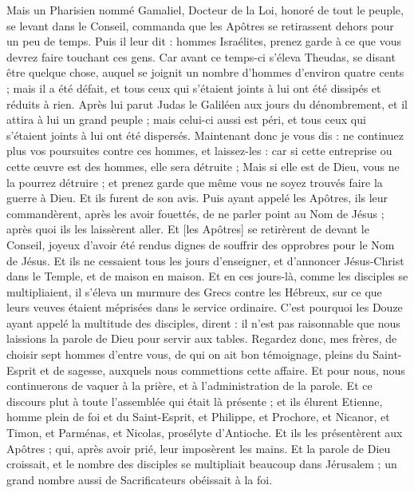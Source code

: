 \begin{multicols}{2}
Mais un Pharisien nommé Gamaliel, Docteur de la Loi, honoré de tout le peuple, se levant dans le Conseil, commanda que les Apôtres se retirassent dehors pour un peu de temps.
Puis il leur dit : hommes Israélites, prenez garde à ce que vous devrez faire touchant ces gens.
Car avant ce temps-ci s'éleva Theudas, se disant être quelque chose, auquel se joignit un nombre d'hommes d'environ quatre cents ; mais il a été défait, et tous ceux qui s'étaient joints à lui ont été dissipés et réduits à rien.
Après lui parut Judas le Galiléen aux jours du dénombrement, et il attira à lui un grand peuple ; mais celui-ci aussi est péri, et tous ceux qui s'étaient joints à lui ont été dispersés.
Maintenant donc je vous dis : ne continuez plus vos poursuites contre ces hommes, et laissez-les : car si cette entreprise ou cette œuvre est des hommes, elle sera détruite ;
Mais si elle est de Dieu, vous ne la pourrez détruire ; et prenez garde que même vous ne soyez trouvés faire la guerre à Dieu. Et ils furent de son avis.
Puis ayant appelé les Apôtres, ils leur commandèrent, après les avoir fouettés, de ne parler point au Nom de Jésus ; après quoi ils les laissèrent aller.
Et [les Apôtres] se retirèrent de devant le Conseil, joyeux d'avoir été rendus dignes de souffrir des opprobres pour le Nom de Jésus.
Et ils ne cessaient tous les jours d'enseigner, et d'annoncer Jésus-Christ dans le Temple, et de maison en maison.
\VerseOne{}Et en ces jours-là, comme les disciples se multipliaient, il s'éleva un murmure des Grecs contre les Hébreux, sur ce que leurs veuves étaient méprisées dans le service ordinaire.
C'est pourquoi les Douze ayant appelé la multitude des disciples, dirent : il n'est pas raisonnable que nous laissions la parole de Dieu pour servir aux tables.
Regardez donc, mes frères, de choisir sept hommes d'entre vous, de qui on ait bon témoignage, pleins du Saint-Esprit et de sagesse, auxquels nous commettions cette affaire.
Et pour nous, nous continuerons de vaquer à la prière, et à l'administration de la parole.
Et ce discours plut à toute l'assemblée qui était là présente ; et ils élurent Etienne, homme plein de foi et du Saint-Esprit, et Philippe, et Prochore, et Nicanor, et Timon, et Parménas, et Nicolas, prosélyte d'Antioche.
Et ils les présentèrent aux Apôtres ; qui, après avoir prié, leur imposèrent les mains.
Et la parole de Dieu croissait, et le nombre des disciples se multipliait beaucoup dans Jérusalem ; un grand nombre aussi de Sacrificateurs obéissait à la foi.

\end{multicols}
